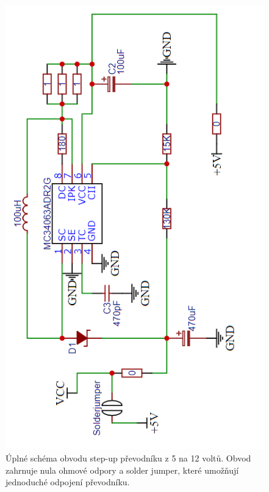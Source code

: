 \documentclass[11pt,a4paper,twoside,openright]{report}
\begin{document}
\begin{figure}[ht!]
  \includegraphics[width=0.8\linewidth]{img/boost_converter.png}
  \centering
  \caption{Úplné schéma obvodu step-up převodníku z 5 na 12 voltů. Obvod zahrnuje nula ohmové odpory a solder jumper, které umožňují jednoduché odpojení převodníku.}
  \label{appendix:boost_converter}
\end{figure}
\end{document}
